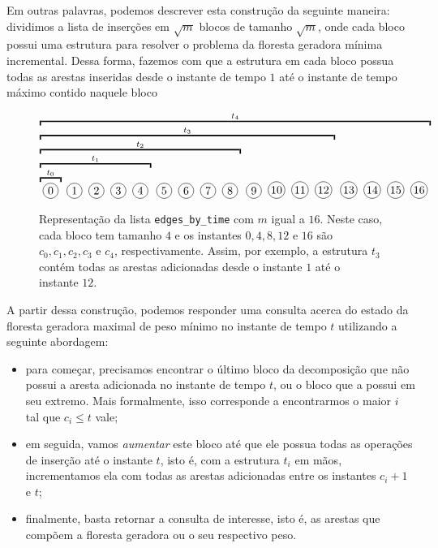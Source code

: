 Em outras palavras, podemos descrever esta construção da seguinte maneira: dividimos a lista de inserções em $\sqrt{m}$ blocos de tamanho $\sqrt{m}$, onde cada bloco possui uma estrutura para resolver o problema da floresta geradora mínima incremental. Dessa forma, fazemos com que a estrutura em cada bloco possua todas as arestas inseridas desde o instante de tempo $1$ até o instante de tempo máximo contido naquele bloco

\begin{figure}
    \centering
    \begin{equation*}
        \overbracket{
            \overbracket{
                \overbracket{
                    \overbracket{
                        \overbracket{
                            \bolinha{\,0\,}
                        }^{t_0}
                        \bolinha{\,1\,}
                        \bolinha{\,2\,}
                        \bolinha{\,3\,}
                        \bolinha{\,4\,}
                    }^{t_1}
                    \bolinha{\,5\,}
                    \bolinha{\,6\,}
                    \bolinha{\,7\,}
                    \bolinha{\,8\,}
                }^{t_2}
                \bolinha{\,9\,}
                \bolinha{10}
                \bolinha{11}
                \bolinha{12}
            }^{t_3}
            \bolinha{13}
            \bolinha{14}
            \bolinha{15}
            \bolinha{16}
        }^{t_4}
    \end{equation*}
    \caption{Representação da lista \texttt{edges\_by\_time} com $m$ igual a $16$. Neste caso, cada bloco tem tamanho $4$ e os instantes $0,4,8,12$ e $16$ são $c_0, c_1, c_2, c_3$ e $c_4$, respectivamente. Assim, por exemplo, a estrutura $t_3$ contém todas as arestas adicionadas desde o instante $1$ até o instante $12$.}
    \label{fig:sqrt-decomp-blocks-m16}
\end{figure}

A partir dessa construção, podemos responder uma consulta acerca do estado da floresta geradora maximal de peso mínimo no instante de tempo $t$ utilizando a seguinte abordagem:

\begin{itemize}
    \item para começar, precisamos encontrar o último bloco da decomposição que não possui a aresta adicionada no instante de tempo $t$, ou o bloco que a possui em seu extremo. Mais formalmente, isso corresponde a encontrarmos o maior $i$ tal que $c_i \leq t$ vale;
    \item em seguida, vamos \emph{aumentar} este bloco até que ele possua todas as operações de inserção até o instante $t$, isto é, com a estrutura $t_i$ em mãos, incrementamos ela com todas as arestas adicionadas entre os instantes $c_i + 1$ e $t$;
    \item finalmente, basta retornar a consulta de interesse, isto é, as arestas que compõem a floresta geradora ou o seu respectivo peso.
\end{itemize}

